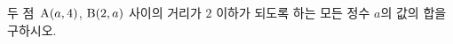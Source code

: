 두 점~$\mathrm{A}(a{,}\mkern3mu\mathopen{}4)$, $\mathrm{B}(2{,}\mkern3mu\mathopen{}a)$ 사이의 거리가 $2$ 이하가 되도록 하는 모든 정수 $a$의 값의 합을 구하시오.
